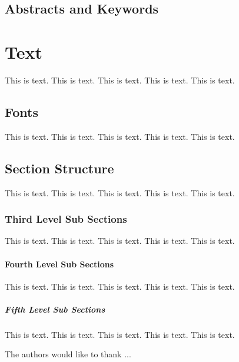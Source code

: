 \documentclass{LNOR}
\begin{document}
\subsection{Abstracts and Keywords}


\section{Text}

This is text. This is text. This is text. This is text. This is text.

\subsection{Fonts}

This is text. This is text. This is text. This is text. This is text.

\subsection{Section Structure}

This is text. This is text. This is text. This is text. This is text.

\subsubsection{Third Level Sub Sections}

This is text. This is text. This is text. This is text. This is text.

\paragraph{Fourth Level Sub Sections}

This is text. This is text. This is text. This is text. This is text.

\subparagraph{Fifth Level Sub Sections}

This is text. This is text. This is text. This is text. This is text.

\Acknowledgements

The authors would like to thank ...


\begin{thebibliography}{99}






\end{thebibliography}


\end{document}
